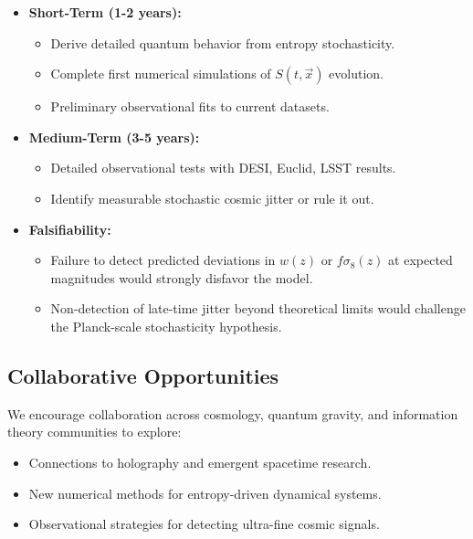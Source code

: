 \documentclass{article}
\begin{document}
\begin{itemize}
    \item \textbf{Short-Term (1-2 years):}
    \begin{itemize}
        \item Derive detailed quantum behavior from entropy stochasticity.
        \item Complete first numerical simulations of $S(t, \vec{x})$ evolution.
        \item Preliminary observational fits to current datasets.
    \end{itemize}

    \item \textbf{Medium-Term (3-5 years):}
    \begin{itemize}
        \item Detailed observational tests with DESI, Euclid, LSST results.
        \item Identify measurable stochastic cosmic jitter or rule it out.
    \end{itemize}

    \item \textbf{Falsifiability:}
    \begin{itemize}
        \item Failure to detect predicted deviations in $w(z)$ or $f\sigma_8(z)$ at expected magnitudes would strongly disfavor the model.
        \item Non-detection of late-time jitter beyond theoretical limits would challenge the Planck-scale stochasticity hypothesis.
    \end{itemize}
\end{itemize}



\subsection{Collaborative Opportunities}

We encourage collaboration across cosmology, quantum gravity, and information theory communities to explore:

\begin{itemize}
    \item Connections to holography and emergent spacetime research.
    \item New numerical methods for entropy-driven dynamical systems.
    \item Observational strategies for detecting ultra-fine cosmic signals.
\end{itemize}
\end{document}
